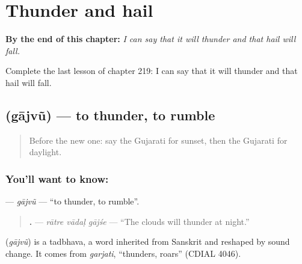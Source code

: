 
\chapter{Thunder and hail}
\label{ch:gu-thunder-and-hail}

\begin{chapteropening}
\textbf{By the end of this chapter:} \emph{I can say that it will thunder and that hail will fall.}

Complete the last lesson of chapter 219: I can say that it will thunder and that hail will fall.
\end{chapteropening}

\section[\texorpdfstring{\gu{ગાજવું} (gājvũ)}{ગાજવું (gājvũ)}]{ (gājvũ) — to thunder, to rumble}

\label{lesson:GU-C219-gajvu}



\begin{quote}
Before the new one: say the Gujarati for sunset, then the Gujarati for daylight.
\end{quote}

\subsection*{You'll want to know: }
\textbf{} — \emph{gājvũ} — \textquotedblleft{}to thunder, to rumble\textquotedblright{}.

\begin{quote}
\textbf{  .} — \emph{rātre vādaḷ gājśe} — \textquotedblleft{}The clouds will thunder at night.\textquotedblright{}
\end{quote}

\begin{cousinweb}
\textbf{} (\emph{gājvũ}) is a tadbhava, a word inherited from Sanskrit and reshaped by sound change. It comes from \emph{garjati}, \textquotedblleft{}thunders, roars\textquotedblright{} (CDIAL 4046).
\end{cousinweb}


